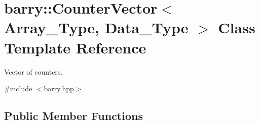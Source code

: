 \hypertarget{classbarry_1_1_counter_vector}{}\section{barry\+:\+:Counter\+Vector$<$ Array\+\_\+\+Type, Data\+\_\+\+Type $>$ Class Template Reference}
\label{classbarry_1_1_counter_vector}


Vector of counters.  




{\ttfamily \#include $<$barry.\+hpp$>$}

\subsection*{Public Member Functions}

